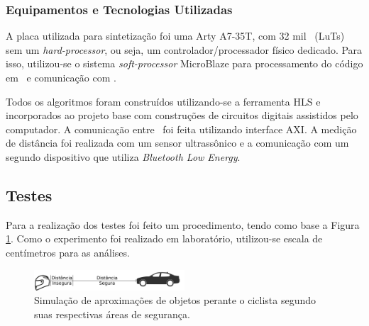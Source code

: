     
    \subsubsection{Equipamentos e Tecnologias Utilizadas}
        A placa utilizada para sintetização foi uma Arty A7-35T, com 32 mil \luts\ (LuTs) sem um \textit{hard-processor}, ou seja, um controlador/processador físico dedicado.
        Para isso, utilizou-se o sistema \textit{soft-processor} MicroBlaze para processamento do código em \software\ e comunicação com \hardware.
        
        
        Todos os algoritmos foram construídos utilizando-se a ferramenta HLS e incorporados ao projeto base com construções de circuitos digitais assistidos pelo computador.
        A comunicação entre \hs\ foi feita utilizando interface AXI.
        A medição de distância foi realizada com um sensor ultrassônico e a comunicação com um segundo dispositivo que utiliza \textit{Bluetooth Low Energy}.
        
        
    \subsection{Testes}
        Para a realização dos testes foi feito um procedimento, tendo como base a Figura \ref{fig:distance}. 
        Como o experimento foi realizado em laboratório, utilizou-se escala de centímetros para as análises.
        
        \begin{figure}[h] \centering
            \includegraphics[width=0.5\textwidth]{img/distance.png}
            \caption{Simulação de aproximações de objetos perante o ciclista segundo suas respectivas áreas de segurança.}
            \label{fig:distance}
        \end{figure}
    

